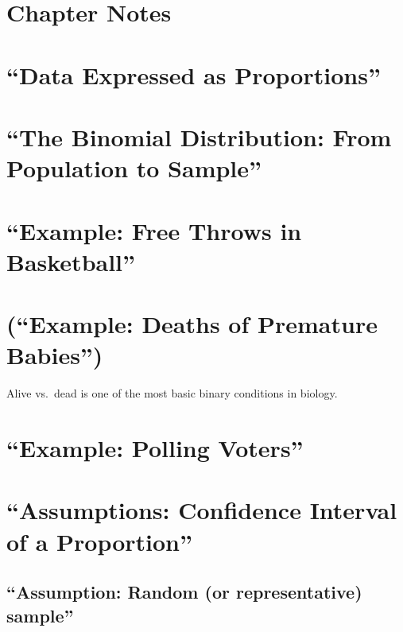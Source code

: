 \documentclass[]{book}
\theoremstyle{definition}
\theoremstyle{definition}
\theoremstyle{definition}
\theoremstyle{remark}
\begin{document}
\section*{Chapter Notes}\label{chapter-notes-2}

\section{\texorpdfstring{``Data Expressed as
Proportions''}{Data Expressed as Proportions}}\label{data-expressed-as-proportions}

\section{\texorpdfstring{``The Binomial Distribution: From Population to
Sample''}{The Binomial Distribution: From Population to Sample}}\label{the-binomial-distribution-from-population-to-sample}

\section{\texorpdfstring{``Example: Free Throws in
Basketball''}{Example: Free Throws in Basketball}}\label{example-free-throws-in-basketball}

\section{\texorpdfstring{(``Example: Deaths of Premature
Babies'')}{(Example: Deaths of Premature Babies)}}\label{example-deaths-of-premature-babies}

Alive vs.~dead is one of the most basic binary conditions in biology.

\section{\texorpdfstring{``Example: Polling
Voters''}{Example: Polling Voters}}\label{example-polling-voters}

\section{\texorpdfstring{``Assumptions: Confidence Interval of a
Proportion''}{Assumptions: Confidence Interval of a Proportion}}\label{assumptions-confidence-interval-of-a-proportion}

\subsection{\texorpdfstring{``Assumption: Random (or representative)
sample''}{Assumption: Random (or representative) sample}}\label{assumption-random-or-representative-sample}
\end{document}

